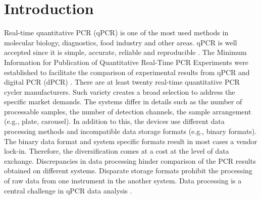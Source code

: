 \documentclass{bioinfo}
\begin{document}
\section{Introduction}
  Real-time quantitative PCR (qPCR) is one of the most used methods in molecular 
biology, diagnostics, food industry and other areas. qPCR is well accepted since 
it is simple, accurate, reliable and reproducible \cite{pabinger_2014}. The 
Minimum Information for Publication of Quantitative Real-Time PCR Experiments
were established to facilitate the comparison of experimental results from qPCR 
and digital PCR (dPCR) \cite{huggett_2013}. There are at least twenty real-time 
quantitative PCR cycler manufacturers. Such variety creates a broad selection to 
address the specific market demands. The systems differ in details such as the 
number of processable samples, the number of detection channels, the sample 
arrangement (e.g., plate, carousel). In addition to this, the devices use different 
data processing methods and incompatible data storage formats (e.g.,  binary formats). 
The binary data format and system specific formats result in most cases a vendor 
lock-in. Therefore, the diversification comes at a cost at the level of data 
exchange. Discrepancies in data processing hinder comparison of the PCR results 
obtained on different systems. Disparate storage formats prohibit the processing 
of raw data from one instrument in the another system. Data processing is a 
central challenge in qPCR data analysis \cite{bustin_reproducibility_2014, roediger2015r, 
spiess_impact_2014}.
\end{document}
